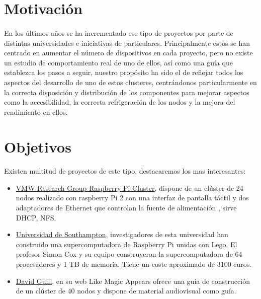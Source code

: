 \section{Motivación}
\label{makereference1.2}
\paragraph{}
En los últimos años se ha incrementado ese tipo de proyectos por parte de distintas universidades e iniciativas de particulares. Principalmente estos se han centrado en aumentar el número de dispositivos en cada proyecto, pero no existe un estudio de comportamiento real de uno de ellos, así como una guía que establezca los pasos a seguir, nuestro propósito ha sido el de reflejar todos los aspectos del desarrollo de uno de estos clusteres, centrándonos particularmente en la correcta disposición y distribución de los componentes para mejorar aspectos como la accesibilidad, la correcta refrigeración de los nodos y la mejora del rendimiento en ellos.


\section{Objetivos}
\label{makereference1.3}
\paragraph{}
Existen multitud de proyectos de este tipo, destacaremos los mas interesantes: 

\begin{itemize}

\item \href{http://web.eece.maine.edu/~vweaver/projects/pi-cluster}{VMW Research Group Raspberry Pi Cluster}, dispone de un clúster de 24 nodos realizado con raspberry Pi 2 con una interfaz de pantalla táctil y dos adaptadores de Ethernet que controlan la fuente de alimentación , sirve DHCP, NFS.  
    
\item\href{http://www.southampton.ac.uk/~sjc/raspberrypi}{Universidad de Southampton}, investigadores de esta universidad han construido una supercomputadora de Raspberry Pi unidas con Lego. El profesor Simon Cox y su equipo construyeron la supercomputadora de 64 procesadores y 1 TB de memoria. Tiene un coste aproximado de 3100 euros.
    
\item\href{http://likemagicappears.com/projects/raspberry-pi-cluster/}{David Guill}, en su web Like Magic Appears ofrece una guía de construcción de un clúster de 40 nodos y dispone de material audiovisual como guía.
    
    
    
\end{itemize}


